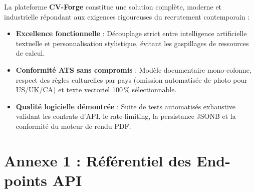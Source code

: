 \documentclass[11pt,a4paper]{article}
\begin{document}
La plateforme \textbf{CV-Forge} constitue une solution complète, moderne et industrielle répondant aux exigences rigoureuses du recrutement contemporain :
\begin{itemize}
    \item \textbf{Excellence fonctionnelle} : Découplage strict entre intelligence artificielle textuelle et personnalisation stylistique, évitant les gaspillages de ressources de calcul.
    \item \textbf{Conformité ATS sans compromis} : Modèle documentaire mono-colonne, respect des règles culturelles par pays (omission automatisée de photo pour US/UK/CA) et texte vectoriel 100\,\% sélectionnable.
    \item \textbf{Qualité logicielle démontrée} : Suite de tests automatisés exhaustive validant les contrats d'API, le rate-limiting, la persistance JSONB et la conformité du moteur de rendu PDF.
\end{itemize}

\newpage

\appendix
\section{Annexe 1 : Référentiel des End-points API}
\end{document}
